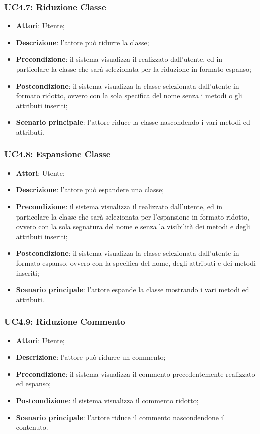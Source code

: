 \subsubsection{UC4.7: Riduzione Classe}
\label{UC4.7}
\begin{itemize}
\item \textbf{Attori}: Utente;
\item \textbf{Descrizione}: l'attore può ridurre la classe;
\item \textbf{Precondizione}: il sistema visualizza il  realizzato dall'utente, ed in particolare la classe che sarà selezionata per la riduzione in formato espanso;	
\item \textbf{Postcondizione}: il sistema visualizza la classe selezionata dall'utente in formato ridotto, ovvero con la sola specifica del nome senza i metodi o gli attributi inseriti;	
\item \textbf{Scenario principale}:
l'attore riduce la classe nascondendo i vari metodi ed attributi.
\end{itemize}

\subsubsection{UC4.8: Espansione Classe	}
\label{UC4.8}
\begin{itemize}
\item \textbf{Attori}: Utente;
\item \textbf{Descrizione}: l'attore può espandere una classe;	
\item \textbf{Precondizione}: il sistema visualizza il  realizzato dall'utente, ed in particolare la classe che sarà selezionata per l'espansione in formato ridotto, ovvero con la sola segnatura del nome e senza la visibilità dei metodi e degli attributi inseriti;	
\item \textbf{Postcondizione}:  il sistema visualizza la classe selezionata dall'utente in formato espanso, ovvero con la specifica del nome, degli attributi e dei metodi inseriti;
\item \textbf{Scenario principale}:
l'attore espande la classe mostrando i vari metodi ed attributi.	
\end{itemize}

\subsubsection{UC4.9: Riduzione Commento}
\label{UC4.9}
\begin{itemize}
\item \textbf{Attori}: Utente;
\item \textbf{Descrizione}: l'attore può ridurre un commento;	
\item \textbf{Precondizione}: il sistema visualizza il commento precedentemente realizzato ed espanso;	
\item \textbf{Postcondizione}: il sistema visualizza il commento ridotto;	
\item \textbf{Scenario principale}:
l'attore riduce il commento nascondendone il contenuto.	
\end{itemize}

